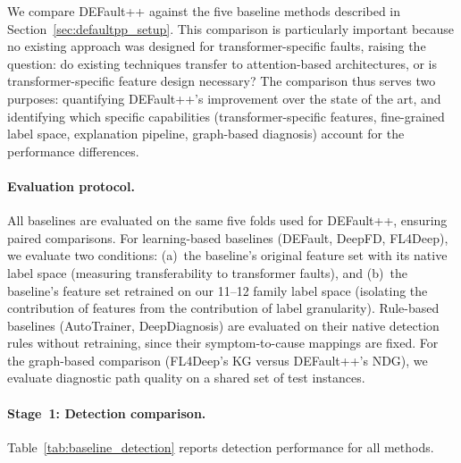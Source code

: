 We compare DEFault++ against the five baseline methods described in Section~\ref{sec:defaultpp_setup}. This comparison is particularly important because no existing approach was designed for transformer-specific faults, raising the question: do existing techniques transfer to attention-based architectures, or is transformer-specific feature design necessary? The comparison thus serves two purposes: quantifying DEFault++'s improvement over the state of the art, and identifying which specific capabilities (transformer-specific features, fine-grained label space, explanation pipeline, graph-based diagnosis) account for the performance differences.

\paragraph{Evaluation protocol.}
All baselines are evaluated on the same five folds used for DEFault++, ensuring paired comparisons. For learning-based baselines (DEFault, DeepFD, FL4Deep), we evaluate two conditions: (a)~the baseline's original feature set with its native label space (measuring transferability to transformer faults), and (b)~the baseline's feature set retrained on our 11--12 family label space (isolating the contribution of features from the contribution of label granularity). Rule-based baselines (AutoTrainer, DeepDiagnosis) are evaluated on their native detection rules without retraining, since their symptom-to-cause mappings are fixed. For the graph-based comparison (FL4Deep's KG versus DEFault++'s NDG), we evaluate diagnostic path quality on a shared set of test instances.

\paragraph{Stage~1: Detection comparison.}
Table~\ref{tab:baseline_detection} reports detection performance for all methods.

